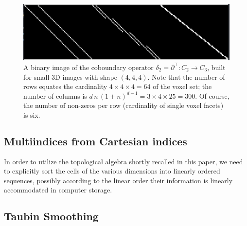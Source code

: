 \begin{figure}[htbp] %
   \centering
   \includegraphics[width=0.75\linewidth]{figs/boundary_matrix_4x4x4.pdf} 
   \caption{A binary image of the coboundary operator  $\delta_2 = \partial^\top : C_2 \to C_3$, built for small 3D images with shape $(4,4,4)$. Note that the number of rows equates the cardinality $4\times 4\times 4 = 64$ of the voxel set; the number of columns is $d\,n\,(1+n)^{d-1} = 3\times 4\times 25 = 300$. Of course, the number of non-zeros per row (cardinality of single voxel facets) is six.}
   \label{fig:boundary_matrix_4x4x4}
\end{figure}

\subsection{Multiindices from Cartesian indices}\label{sec:aaaa}

In order to utilize the topological algebra shortly recalled in this paper, we need to explicitly sort the cells of the various dimensions into linearly ordered sequences, possibly according to the linear order their information is linearly accommodated in computer storage. 

\subsection{Taubin Smoothing}\label{sec:aaaa}



